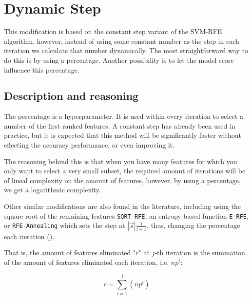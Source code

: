 \newcommand{\VS}{\vspace{6pt}}
\newcommand{\vt}[1]{\vec{#1}}

\chapter{Dynamic Step} %

\label{Chapter1} %


This modification is based on the constant step variant of the SVM-RFE algorithm, however, instead of using some constant number as the step in each iteration we calculate that number dynamically. The most straightforward way to do this is by using a percentage. Another possibility is to let the model score influence this percentage.

\section{Description and reasoning}
\label{sec:dynamicStep.desc}

The percentage is a hyperparameter. It is used within every iteration to select a number of the first ranked features. A constant step has already been used in pract\-ice, but it is expected that this method will be significantly faster without effecting the accuracy performance, or even improving it.

The reasoning behind this is that when you have many features for which you only want to select a very small subset, the required amount of iterations will be of lineal complexity on the amount of features, however, by using a percentage, we get a logarithmic complexity.

Other similar modifications are also found in the literature, including using the square root of the remaining features \texttt{SQRT-RFE}, an entropy based function \texttt{E-RFE}, or \texttt{RFE-Annealing} which sets the step at $|\vt{s}| \frac{1}{i+1}$, thus, changing the percentage each iteration (\cite{ding_improving_2006}).

\iffalse
That is, the amount of features eliminated "$r$" at $j$-th iteration is the summation of the amount of features eliminated each iteration, i.e. $np^i$:

\begin{equation}\label{eq:dynamicStep1}
    r = \sum_{i = 1}^{j}{(np^i)} 
\end{equation}

